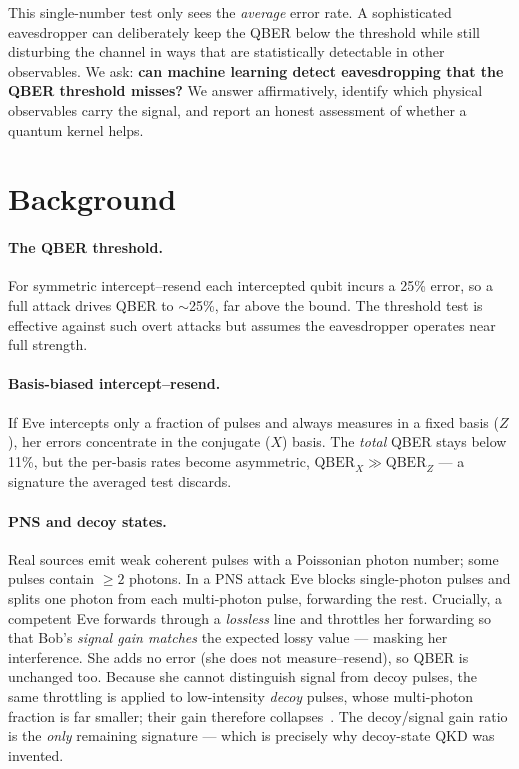 \documentclass[11pt]{article}
\begin{document}
This single-number test only sees the \emph{average} error rate. A sophisticated
eavesdropper can deliberately keep the QBER below the threshold while still disturbing
the channel in ways that are statistically detectable in other observables. We ask:
\textbf{can machine learning detect eavesdropping that the QBER threshold misses?}
We answer affirmatively, identify which physical observables carry the signal, and
report an honest assessment of whether a quantum kernel helps.

\section{Background}
\paragraph{The QBER threshold.} For symmetric intercept--resend each intercepted
qubit incurs a 25\% error, so a full attack drives QBER to $\sim$25\%, far above the
bound. The threshold test is effective against such overt attacks but assumes the
eavesdropper operates near full strength.

\paragraph{Basis-biased intercept--resend.} If Eve intercepts only a fraction of
pulses and always measures in a fixed basis ($Z$), her errors concentrate in the
conjugate ($X$) basis. The \emph{total} QBER stays below 11\%, but the per-basis rates
become asymmetric, $\mathrm{QBER}_X \gg \mathrm{QBER}_Z$ --- a signature the averaged
test discards.

\paragraph{PNS and decoy states.} Real sources emit weak coherent pulses with a
Poissonian photon number; some pulses contain $\ge 2$ photons. In a PNS attack Eve
blocks single-photon pulses and splits one photon from each multi-photon pulse,
forwarding the rest. Crucially, a competent Eve forwards through a \emph{lossless}
line and throttles her forwarding so that Bob's \emph{signal gain matches} the
expected lossy value --- masking her interference. She adds no error (she does not
measure--resend), so QBER is unchanged too. Because she cannot distinguish signal
from decoy pulses, the same throttling is applied to low-intensity \emph{decoy}
pulses, whose multi-photon fraction is far smaller; their gain therefore
collapses~\cite{decoy}. The decoy/signal gain ratio is the \emph{only} remaining
signature --- which is precisely why decoy-state QKD was invented.
\end{document}
